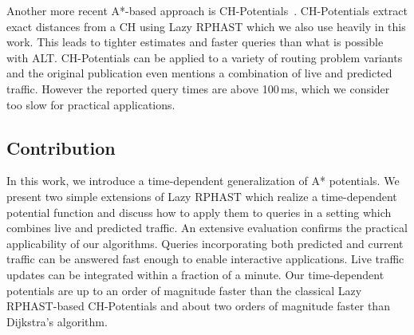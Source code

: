 \documentclass[a4paper,UKenglish,cleveref, autoref, thm-restate,anonymous]{lipics-v2021}
\begin{document}
Another more recent A*-based approach is CH-Potentials~\cite{strasser_et_al:LIPIcs.SEA.2021.6}.
CH-Potentials extract exact distances from a CH using Lazy RPHAST which we also use heavily in this work.
This leads to tighter estimates and faster queries than what is possible with ALT.
CH-Potentials can be applied to a variety of routing problem variants and the original publication even mentions a combination of live and predicted traffic.
However the reported query times are above 100\,ms, which we consider too slow for practical applications.

\subsection{Contribution}

In this work, we introduce a time-dependent generalization of A* potentials.
We present two simple extensions of Lazy RPHAST which realize a time-dependent potential function and discuss how to apply them to queries in a setting which combines live and predicted traffic.
An extensive evaluation confirms the practical applicability of our algorithms.
Queries incorporating both predicted and current traffic can be answered fast enough to enable interactive applications.
Live traffic updates can be integrated within a fraction of a minute.
Our time-dependent potentials are up to an order of magnitude faster than the classical Lazy RPHAST-based CH-Potentials and about two orders of magnitude faster than Dijkstra's algorithm.
\end{document}
